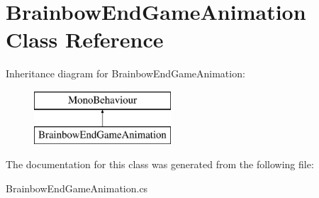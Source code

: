 \hypertarget{class_brainbow_end_game_animation}{}\section{Brainbow\+End\+Game\+Animation Class Reference}
\label{class_brainbow_end_game_animation}
Inheritance diagram for Brainbow\+End\+Game\+Animation\+:\begin{figure}[H]
\begin{center}
\leavevmode
\includegraphics[height=2.000000cm]{class_brainbow_end_game_animation}
\end{center}
\end{figure}


The documentation for this class was generated from the following file\+:\begin{DoxyCompactItemize}
\item 
Brainbow\+End\+Game\+Animation.\+cs\end{DoxyCompactItemize}
